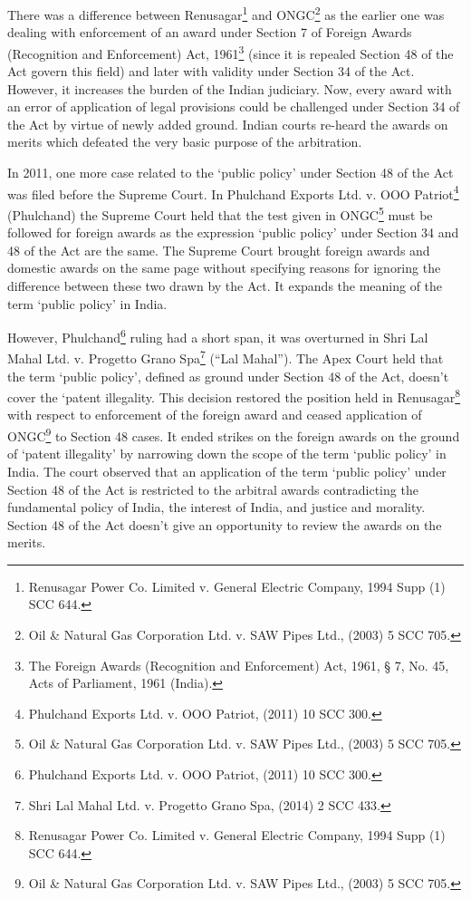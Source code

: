 \begin{multicols}{2}
\noi
There was a difference between Renusagar\footnote{Renusagar Power Co. Limited v. General Electric Company, 1994 Supp (1) SCC 644.} and ONGC\footnote{Oil \& Natural Gas Corporation Ltd. v. SAW Pipes Ltd., (2003) 5 SCC 705.} as the earlier one was dealing with
enforcement of an award under Section 7 of Foreign Awards (Recognition and Enforcement)
Act, 1961\footnote{The Foreign Awards (Recognition and Enforcement) Act, 1961, § 7, No. 45, Acts of Parliament, 1961 (India).} (since it is repealed Section 48 of the Act govern this field) and later with validity
under Section 34 of the Act. However, it increases the burden of the Indian judiciary. Now,
every award with an error of application of legal provisions could be challenged under Section
34 of the Act by virtue of newly added ground. Indian courts re-heard the awards on merits
which defeated the very basic purpose of the arbitration.

\noi
In 2011, one more case related to the ‘public policy’ under Section 48 of the Act was filed
before the Supreme Court. In Phulchand Exports Ltd. v. OOO Patriot\footnote{Phulchand Exports Ltd. v. OOO Patriot, (2011) 10 SCC 300.} (Phulchand) the
Supreme Court held that the test given in ONGC\footnote{Oil \& Natural Gas Corporation Ltd. v. SAW Pipes Ltd., (2003) 5 SCC 705.} must be followed for foreign awards as the
expression ‘public policy’ under Section 34 and 48 of the Act are the same. The Supreme
Court brought foreign awards and domestic awards on the same page without specifying
reasons for ignoring the difference between these two drawn by the Act. It expands the
meaning of the term ‘public policy’ in India.

\noi
However, Phulchand\footnote{Phulchand Exports Ltd. v. OOO Patriot, (2011) 10 SCC 300.} ruling had a short span, it was overturned in Shri Lal Mahal Ltd. v.
Progetto Grano Spa\footnote{Shri Lal Mahal Ltd. v. Progetto Grano Spa, (2014) 2 SCC 433.} (“Lal Mahal”). The Apex Court held that the term ‘public policy’,
defined as ground under Section 48 of the Act, doesn’t cover the ‘patent illegality. This
decision restored the position held in Renusagar\footnote{Renusagar Power Co. Limited v. General Electric Company, 1994 Supp (1) SCC 644.} with respect to enforcement of the foreign
award and ceased application of ONGC\footnote{Oil \& Natural Gas Corporation Ltd. v. SAW Pipes Ltd., (2003) 5 SCC 705.} to Section 48 cases. It ended strikes on the foreign
awards on the ground of ‘patent illegality’ by narrowing down the scope of the term ‘public
policy’ in India. The court observed that an application of the term ‘public policy’ under
Section 48 of the Act is restricted to the arbitral awards contradicting the fundamental policy of India, the interest of India, and justice and morality. Section 48 of the Act doesn’t give an
opportunity to review the awards on the merits.


\end{multicols}

